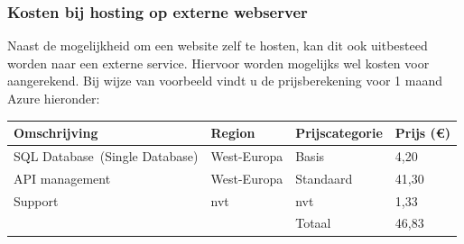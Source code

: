 \subsubsection{Kosten bij hosting op externe webserver}
Naast de mogelijkheid om een website zelf te hosten, kan dit ook uitbesteed worden naar een externe service.
Hiervoor worden mogelijks wel kosten voor aangerekend. Bij wijze van voorbeeld vindt u de prijsberekening voor 1 maand Azure hieronder:
\begin{center}
  \newline
  \begin{tabular}{ | l | l | l | l |}
  \hline
  Omschrijving & Region & Prijscategorie & Prijs (€)
  \\ \hline
  SQL Database (Single Database) & West-Europa & Basis & 4,20
  \\ \hline
  API management & West-Europa & Standaard & 41,30
  \\ \hline
  Support & nvt & nvt & 1,33
  \\ \hline
   & & Totaal &  46,83
  \\ \hline
  \end{tabular}
\end{center}
